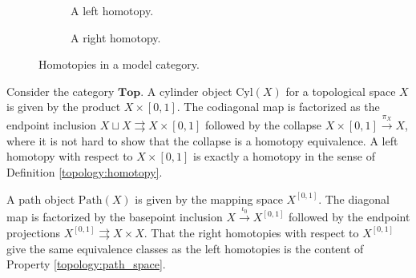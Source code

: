{        \begin{figure}
            \centering
            \begin{subfigure}[b]{0.49\textwidth}
                \centering
                \caption{A left homotopy.}
                \label{fig:left_homotopy}
            \end{subfigure}
            \begin{subfigure}[b]{0.49\textwidth}
                \centering
                \caption{A right homotopy.}
                \label{fig:right_homotopy}
            \end{subfigure}
            \caption{Homotopies in a model category.}
        \end{figure}
    }

    \begin{example}
        Consider the category $\mathbf{Top}$. A cylinder object $\mathrm{Cyl}(X)$ for a topological space $X$ is given by the product $X\times[0,1]$. The codiagonal map is factorized as the endpoint inclusion $X\sqcup X\rightrightarrows X\times[0,1]$ followed by the collapse $X\times[0,1]\overset{\pi_X}{\rightarrow}X$, where it is not hard to show that the collapse is a homotopy equivalence. A left homotopy with respect to $X\times[0,1]$ is exactly a homotopy in the sense of Definition \ref{topology:homotopy}.

        A path object $\mathrm{Path}(X)$ is given by the mapping space $X^{[0,1]}$. The diagonal map is factorized by the basepoint inclusion $X\overset{\iota_0}{\rightarrow}X^{[0,1]}$ followed by the endpoint projections $X^{[0,1]}\rightrightarrows X\times X$. That the right homotopies with respect to $X^{[0,1]}$ give the same equivalence classes as the left homotopies is the content of Property \ref{topology:path_space}.
    \end{example}

